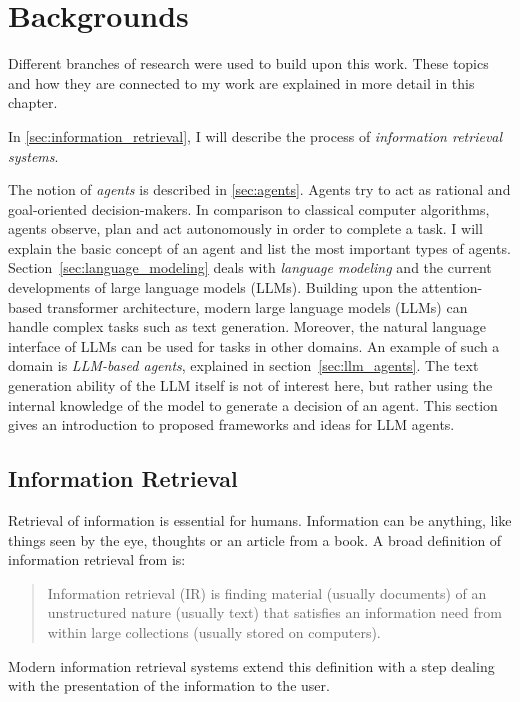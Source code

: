 \documentclass[../main.tex]{subfiles}
\begin{document}
\chapter{Backgrounds}
\label{ch:backgrounds}

Different branches of research were used to build upon this work.
These topics and how they are connected to my work
are explained in more detail in this chapter.

In \autoref{sec:information_retrieval},
I will describe the process of \emph{information retrieval systems}.

The notion of \emph{agents} is described in \autoref{sec:agents}.
Agents try to act as rational and goal-oriented decision-makers.
In comparison to classical computer algorithms,
agents observe, plan and act autonomously in order to complete a task.
I will explain the basic concept of an agent and list the most important types of agents.
Section~\ref{sec:language_modeling} deals with \emph{language modeling}
and the current developments of large language models (LLMs).
Building upon the attention-based transformer architecture, modern large language models (LLMs)
can handle complex tasks such as text generation.
Moreover, the natural language interface of LLMs can be used for tasks in other domains.
An example of such a domain is \emph{LLM-based agents}, explained in section~\ref{sec:llm_agents}.
The text generation ability of the LLM itself is not of interest here,
but rather using the internal knowledge of the model to generate a decision of an agent.
This section gives an introduction to proposed frameworks and ideas for LLM agents.

\section{Information Retrieval}
\label{sec:information_retrieval}
Retrieval of information is essential for humans.
Information can be anything, like things seen by the eye,
thoughts or an article from a book.
A broad definition of information retrieval from \cite{Manning2009} is:
\begin{quote}
    Information retrieval (IR) is finding material (usually documents)
    of an unstructured nature (usually text)
    that satisfies an information need
    from within large collections (usually stored on computers).
\end{quote}
Modern information retrieval systems extend this definition with a step
dealing with the presentation of the information to the user.
\end{document}
